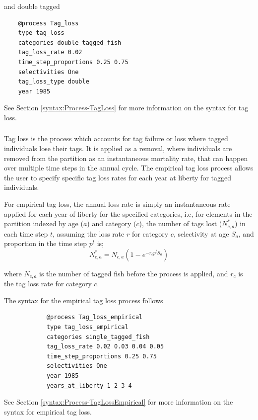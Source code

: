and double tagged

{\small{\begin{verbatim}
	@process Tag_loss
	type tag_loss
	categories double_tagged_fish
	tag_loss_rate 0.02
	time_step_proportions 0.25 0.75
	selectivities One
	tag_loss_type double
	year 1985
\end{verbatim}}}

See Section \ref{syntax:Process-TagLoss} for more information on the syntax for tag loss.

\subsubsection{}\label{sec:Process-TagLossEmpirical} 

Tag loss is the process which accounts for tag failure or loss where tagged individuals lose their tags. It is applied as a removal, where individuals are removed from the partition as an instantaneous mortality rate, that can happen over multiple time steps in the annual cycle. The empirical tag loss process allows the user to specify specific tag loss rates for each year at liberty for tagged individuals.

For empirical tag loss, the annual loss rate is simply an instantaneous rate applied for each year of liberty for the specified categories, i.e, for elements in the partition indexed by age ($a$) and category ($c$), the number of tags lost ($N^*_{c,a}$) in each time step $t$, assuming the loss rate $r$ for category $c$, selectivity at age $S_a$, and proportion in the time step $p^t$ is; 
\begin{equation}
	N^*_{c,a} = N_{c,a} (1 -e^{-r_c p^t S_a})
\end{equation}

where $N_{c,a}$ is the number of tagged fish before the process is applied, and $r_c$ is the tag loss rate for category $c$.

The syntax for the empirical tag loss process follows

{\small{\begin{verbatim}
			@process Tag_loss_empirical
			type tag_loss_empirical
			categories single_tagged_fish
			tag_loss_rate 0.02 0.03 0.04 0.05
			time_step_proportions 0.25 0.75
			selectivities One
			year 1985
			years_at_liberty 1 2 3 4
\end{verbatim}}}

See Section \ref{syntax:Process-TagLossEmpirical} for more information on the syntax for empirical tag loss.
